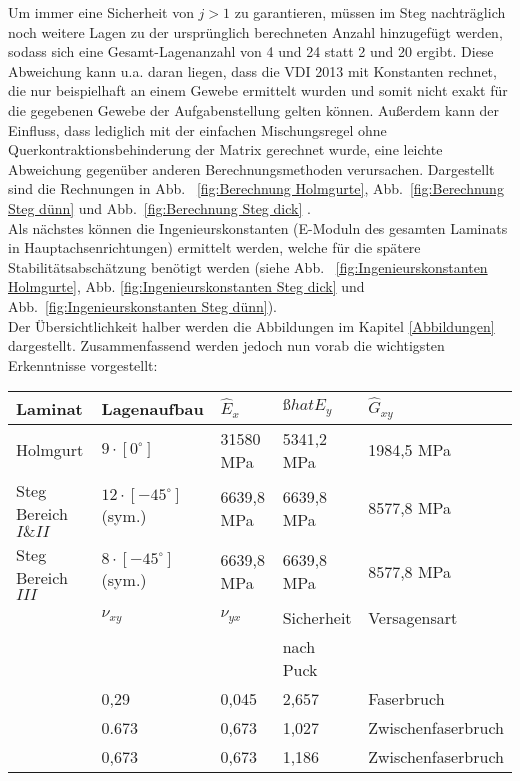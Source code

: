 \noindent Um immer eine Sicherheit von $j>1$ zu garantieren, müssen im Steg nachträglich noch weitere Lagen zu der ursprünglich berechneten Anzahl hinzugefügt werden, sodass sich eine Gesamt-Lagenanzahl von 4 und 24 statt 2 und 20 ergibt. Diese Abweichung kann u.a. daran liegen, dass die VDI 2013 mit Konstanten rechnet, die nur beispielhaft an einem Gewebe ermittelt wurden und somit nicht exakt für die gegebenen Gewebe der Aufgabenstellung gelten können. Außerdem kann der Einfluss, dass lediglich mit der einfachen Mischungsregel ohne Querkontraktionsbehinderung der Matrix gerechnet wurde, eine leichte Abweichung gegenüber anderen Berechnungsmethoden verursachen.
Dargestellt sind die Rechnungen in Abb. ~\ref{fig:Berechnung Holmgurte}, Abb.~\ref{fig:Berechnung Steg dünn} und Abb.~\ref{fig:Berechnung Steg dick} \cite{item3}\cite{item5}.\\

\noindent Als nächstes können die Ingenieurskonstanten (E-Moduln des gesamten Laminats in Hauptachsenrichtungen) ermittelt werden, welche für die spätere Stabilitätsabschätzung benötigt werden (siehe Abb. ~\ref{fig:Ingenieurskonstanten Holmgurte}, Abb. \ref{fig:Ingenieurskonstanten Steg dick} und Abb.~\ref{fig:Ingenieurskonstanten Steg dünn}).\\

\noindent Der Übersichtlichkeit halber werden die Abbildungen im Kapitel \ref{Abbildungen} dargestellt. Zusammenfassend werden jedoch nun vorab die wichtigsten Erkenntnisse vorgestellt:

\begin{longtable}{lllll}

Laminat&Lagenaufbau&$\hat{E}_{x}$&$ßhat{E}_{y}$&$\hat{G}_{xy}$\\
\hline\hline
Holmgurt&$9\cdot[0^{\circ}]$&31580 MPa&5341,2 MPa&1984,5 MPa\\
Steg Bereich $I\&II$&$12\cdot[-45^{\circ}]$(sym.)&6639,8 MPa&6639,8 MPa&8577,8 MPa\\
Steg Bereich $III$&$8\cdot[-45^{\circ}]$(sym.)&6639,8 MPa&6639,8 MPa&8577,8 MPa\\
\hline
&$\nu_{xy}$&$\nu_{yx}$&Sicherheit&Versagensart\\
&&&nach Puck&\\
\hhline{~====}
&0,29&0,045&2,657&Faserbruch\\
&0.673&0,673&1,027&Zwischenfaserbruch\\
&0,673&0,673&1,186&Zwischenfaserbruch\\
\end{longtable}